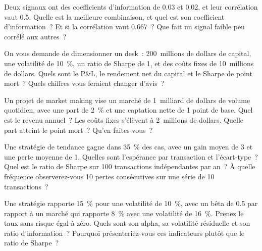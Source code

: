 \begin{question}\label{iq:iv2:research-and-strategy-cases:21}
Deux signaux ont des coefficients d'information de 0.03 et 0.02, et leur corrélation vaut 0.5. Quelle est la meilleure combinaison, et quel est son coefficient d'information~? Et si la corrélation vaut 0.667~? Que fait un signal faible peu corrélé aux autres~?
\end{question}

\begin{question}\label{iq:iv2:research-and-strategy-cases:22}
On vous demande de dimensionner un desk~: 200~millions de dollars de capital, une volatilité de 10~\%, un ratio de Sharpe de 1, et des coûts fixes de 10~millions de dollars. Quels sont le P\&L, le rendement net du capital et le Sharpe de point mort~? Quels chiffres vous feraient changer d'avis~?
\end{question}

\begin{question}\label{iq:iv2:research-and-strategy-cases:23}
Un projet de market making vise un marché de 1~milliard de dollars de volume quotidien, avec une part de 2~\% et une captation nette de 1 point de base. Quel est le revenu annuel~? Les coûts fixes s'élèvent à 2~millions de dollars. Quelle part atteint le point mort~? Qu'en faites-vous~?
\end{question}

\begin{question}\label{iq:iv2:research-and-strategy-cases:24}
Une stratégie de tendance gagne dans 35~\% des cas, avec un gain moyen de 3 et une perte moyenne de 1. Quelles sont l'espérance par transaction et l'écart-type~? Quel est le ratio de Sharpe sur 100 transactions indépendantes par an~? À quelle fréquence observerez-vous 10 pertes consécutives sur une série de 10 transactions~?
\end{question}

\begin{question}\label{iq:iv2:research-and-strategy-cases:25}
Une stratégie rapporte 15~\% pour une volatilité de 10~\%, avec un bêta de 0.5 par rapport à un marché qui rapporte 8~\% avec une volatilité de 16~\%. Prenez le taux sans risque égal à zéro. Quels sont son alpha, sa volatilité résiduelle et son ratio d'information~? Pourquoi présenteriez-vous ces indicateurs plutôt que le ratio de Sharpe~?
\end{question}

